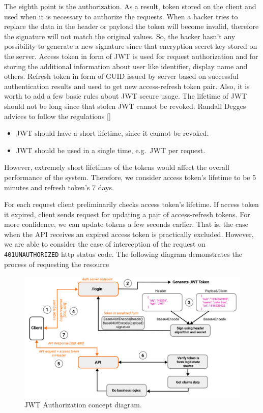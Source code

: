 The eighth point is the authorization.
As a result, token stored on the client and used when it is necessary to authorize the requests.
When a hacker tries to replace the data in the header or payload the token will become invalid,
therefore the signature will not match the original values.
So, the hacker hasn't any possibility to generate a new signature since that encryption secret key stored on the server.
Access token in form of JWT is used for request authorization and for storing the additional information
about user like identifier, display name and others.
Refresh token in form of GUID issued by server based on successful authentication results and used
to get new access-refresh token pair.
Also, it is worth to add a few basic rules about JWT secure usage.
The lifetime of JWT should not be long since that stolen JWT cannot be revoked.
Randall Degges advices to follow the regulations [\cite{RDegges}]
\begin{itemize}
    \item JWT should have a short lifetime, since it cannot be revoked.
    \item JWT should be used in a single time, e.g.\ JWT per request.
\end{itemize}
However, extremely short lifetimes of the tokens would affect the overall performance of the system.
Therefore, we consider access token's lifetime to be 5 minutes and refresh token's 7 days.

For each request client preliminarily checks access token's lifetime.
If access token it expired, client sends request for updating a pair of access-refresh tokens.
For more confidence, we can update tokens a few seconds earlier.
That is, the case when the API receives an expired access token is practically excluded.
However, we are able to consider the case of interception of the request on \texttt{401UNAUTHORIZED} http status code.
The following diagram demonstrates the process of requesting the resource

\begin{figure}[H]
    \centering
    \includegraphics[width=1\textwidth]{Pictures/06_JWT_authorization_concept_diagram}
    \caption{JWT Authorization concept diagram.}\label{fig:figure3}
\end{figure}

